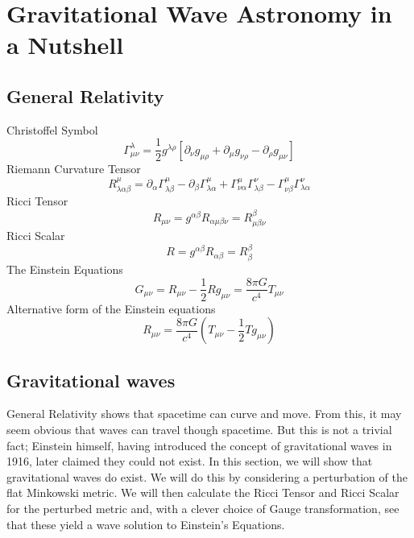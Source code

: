\documentclass[12pt,twoside,a4paper]{report}
\newcommand{\mn}{_{\mu\nu}}
\begin{document}
\chapter{Gravitational Wave Astronomy in a Nutshell} 
\section{General Relativity}

Christoffel Symbol
\begin{equation} \label{christ}
\Gamma^\lambda\mn=\frac{1}{2}g^{\lambda \rho} [\partial_\nu g_{\mu \rho} + \partial_\mu g_{\nu \rho}-\partial_\rho g\mn]
\end{equation}
Riemann Curvature Tensor  
\begin{equation} \label{rct}
R^\mu_{\lambda \alpha \beta} = \partial_\alpha \Gamma^\mu_{\lambda \beta} -\partial_\beta \Gamma^\mu_{\lambda \alpha} + \Gamma^\mu_{\nu \alpha} \Gamma^\nu_{\lambda \beta} - \Gamma^\mu_{\nu \beta} \Gamma^\nu_{\lambda \alpha}
\end{equation}
Ricci Tensor
\begin{equation} \label{rt}
R\mn=g^{\alpha \beta} R_{\alpha \mu \beta \nu}=R^\beta_{\mu \beta \nu}
\end{equation}
Ricci Scalar
\begin{equation} \label{rs}
R=g^{\alpha \beta}R_{\alpha \beta}=R^\beta_\beta
\end{equation}
The Einstein Equations
\begin{equation} \label{eineq}
G\mn =R\mn -\frac{1}{2} R g\mn=\frac{8 \pi G}{c^4}T\mn
\end{equation}
Alternative form of the Einstein equations
\begin{equation} \label{alt einstein}
R\mn = \frac{8 \pi G}{c^4}\left( T\mn - \frac{1}{2}Tg\mn \right) 
\end{equation}


\section{Gravitational waves}
General Relativity shows that spacetime can curve and move. From this, it may seem obvious that waves can travel though spacetime. But this is not a trivial fact; Einstein himself, having introduced the concept of gravitational waves in 1916, later claimed they could not exist. In this section, we will show that gravitational waves do exist. We will do this by considering a perturbation of the flat Minkowski metric. We will then calculate the Ricci Tensor and Ricci Scalar for the perturbed metric and, with a clever choice of Gauge transformation, see that these yield a wave solution to Einstein's Equations. 
\end{document}
